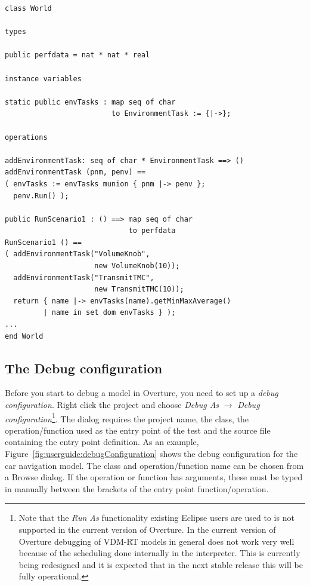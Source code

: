 \begin{lstlisting}
class World

types
  
public perfdata = nat * nat * real

instance variables

static public envTasks : map seq of char 
                         to EnvironmentTask := {|->};

operations

addEnvironmentTask: seq of char * EnvironmentTask ==> ()
addEnvironmentTask (pnm, penv) ==
( envTasks := envTasks munion { pnm |-> penv };
  penv.Run() );

public RunScenario1 : () ==> map seq of char 
                             to perfdata
RunScenario1 () ==
( addEnvironmentTask("VolumeKnob", 
                     new VolumeKnob(10));
  addEnvironmentTask("TransmitTMC", 
                     new TransmitTMC(10));
  return { name |-> envTasks(name).getMinMaxAverage() 
         | name in set dom envTasks } );
...
end World
\end{lstlisting}

\subsection{The Debug configuration}

Before you start to debug a model in Overture, you need to set up a
\emph{debug configuration}. Right click the project and choose
\emph{Debug As} $ \rightarrow $ \emph{Debug configuration}\footnote{Note that the
  \emph{Run As} functionality existing Eclipse users are used to is
  not supported in the current version of Overture. In the current
  version of Overture debugging of VDM-RT models in general does not
  work very well because of the scheduling done internally in the
  interpreter. This is currently being redesigned and it is expected
  that in the next stable release this will be fully operational.}. The dialog
requires the project name, the class, the operation/function used as
the entry point of the test and the source file containing the entry
point definition.  As an example,
Figure~\ref{fig:userguide:debugConfiguration} shows the debug
configuration for the car navigation model. The class and
operation/function name can be chosen from a Browse dialog. If the
operation or function has arguments, these must be typed in manually
between the brackets of the entry point function/operation.

